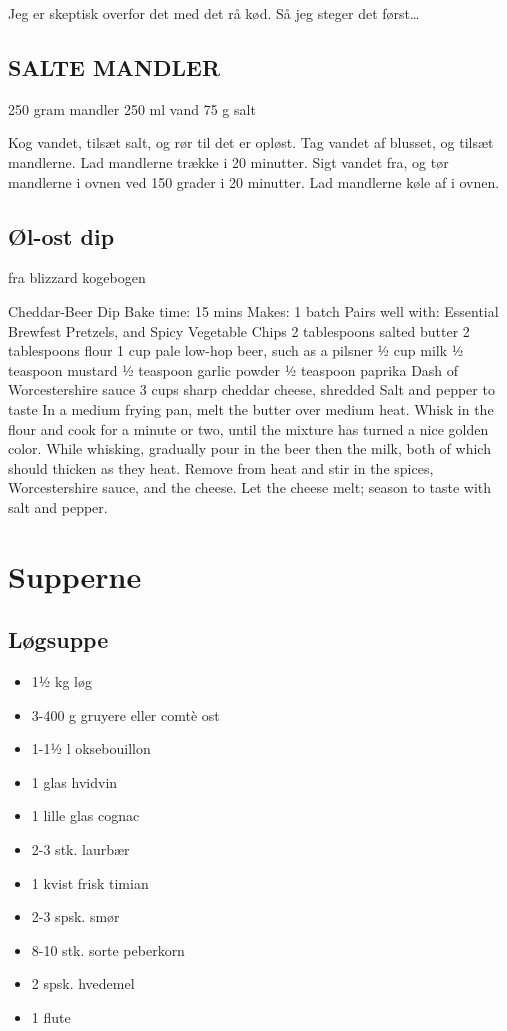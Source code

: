 \documentclass[
]{book}
\providecommand{\tightlist}{%
  \setlength{\itemsep}{0pt}\setlength{\parskip}{0pt}}
\begin{document}
Jeg er skeptisk overfor det med det rå kød. Så jeg steger det først\ldots{}

\hypertarget{salte-mandler}{%
\section{SALTE MANDLER}\label{salte-mandler}}

250 gram mandler
250 ml vand
75 g salt

Kog vandet, tilsæt salt, og rør til det er opløst.
Tag vandet af blusset, og tilsæt mandlerne.
Lad mandlerne trække i 20 minutter.
Sigt vandet fra, og tør mandlerne i ovnen ved 150 grader i 20 minutter. Lad mandlerne køle af i ovnen.

\hypertarget{uxf8l-ost-dip}{%
\section{Øl-ost dip}\label{uxf8l-ost-dip}}

fra blizzard kogebogen

Cheddar-Beer Dip
Bake time: 15 mins Makes: 1 batch
Pairs well with: Essential Brewfest Pretzels, and Spicy Vegetable Chips
2 tablespoons salted butter
2 tablespoons flour
1 cup pale low-hop beer, such as a pilsner
½ cup milk
½ teaspoon mustard
½ teaspoon garlic powder
½ teaspoon paprika
Dash of Worcestershire sauce
3 cups sharp cheddar cheese, shredded
Salt and pepper to taste
In a medium frying pan, melt the butter over medium heat.
Whisk in the flour and cook for a minute or two, until the
mixture has turned a nice golden color. While whisking,
gradually pour in the beer then the milk, both of which should
thicken as they heat. Remove from heat and stir in the spices,
Worcestershire sauce, and the cheese. Let the cheese melt;
season to taste with salt and pepper.

\hypertarget{supperne}{%
\chapter{Supperne}\label{supperne}}

\hypertarget{luxf8gsuppe}{%
\section{Løgsuppe}\label{luxf8gsuppe}}

\begin{itemize}
\tightlist
\item
  1½ kg løg
\item
  3-400 g gruyere eller comtè ost
\item
  1-1½ l oksebouillon
\item
  1 glas hvidvin
\item
  1 lille glas cognac
\item
  2-3 stk. laurbær
\item
  1 kvist frisk timian
\item
  2-3 spsk. smør
\item
  8-10 stk. sorte peberkorn
\item
  2 spsk. hvedemel
\item
  1 flute
\end{itemize}
\end{document}
